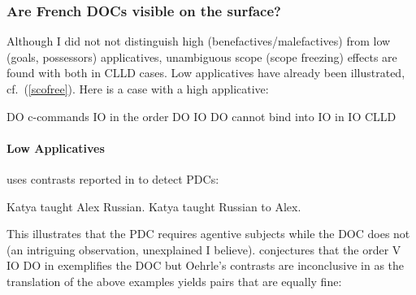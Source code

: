 \documentclass[output=paper]{langsci/langscibook}
\begin{document}
\subsubsection{Are French \glspl{DOC} visible on the surface?}

Although I did not not distinguish high (benefactives/malefactives) from low
(goals, possessors) applicatives, unambiguous scope (scope freezing) effects
are found with both in \gls{CLLD} cases. Low
applicatives have already been illustrated, cf.\ (\ref{scofree}). Here is a
case with a high applicative:

\ea\label{doio6}
    \ea DO c-commands IO in the order DO IO
    \ex DO cannot bind into IO in IO CLLD
\z
\z

\paragraph*{Low Applicatives}

\cite{anagnostopoulou2005cross} uses contrasts reported in \cite{Oehrle:1976}
to detect \glspl{PDC}:

\ea
    \z
\z

\ea \ea Katya taught Alex Russian.
\ex Katya taught Russian to Alex.
\z
\z

\ea
{}
\z
\z

This illustrates that the \gls{PDC}
requires agentive subjects while the \gls{DOC} does not (an intriguing
observation, unexplained  I believe).  \cite{anagnostopoulou2005cross}
conjectures that the order V IO DO in  exemplifies the
\gls{DOC} but Oehrle's contrasts are
inconclusive in  as the translation of the above examples yields pairs
that are equally fine:
\end{document}
